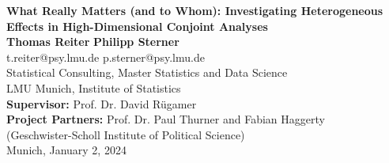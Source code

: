 \documentclass{article}
\begin{document}
\begin{titlepage}
    \thispagestyle{empty} 
    \centering
    \vspace*{1 cm}
    
    {\LARGE \textbf{What Really Matters (and to Whom): Investigating Heterogeneous Effects in High-Dimensional Conjoint Analyses}}\\[1.5 cm]
    
    {\Large \textbf{Thomas Reiter} \quad \textbf{Philipp Sterner}}\\[0.5 cm]
    {\large t.reiter@psy.lmu.de \quad p.sterner@psy.lmu.de}\\[1 cm]
    
    {\large Statistical Consulting, Master Statistics and Data Science\\
    LMU Munich, Institute of Statistics}\\[1.5 cm]
    
    {\large \textbf{Supervisor:} Prof. Dr. David Rügamer}\\[1 cm]
    
    {\large \textbf{Project Partners:} Prof. Dr. Paul Thurner and Fabian Haggerty\\
    (Geschwister-Scholl Institute of Political Science)}\\[2 cm]
    
    {\large Munich, January 2, 2024}
    
    \vfill
\end{titlepage}
\clearpage
{}
\end{document}
